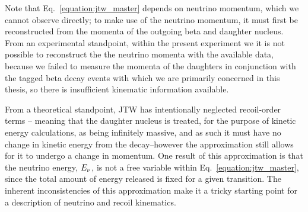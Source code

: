 



Note that Eq.~\ref{equation:jtw_master} depends on neutrino momentum, which we cannot observe directly;  to make use of the neutrino momentum, it must first be reconstructed from the momenta of the outgoing beta and daughter nucleus.
From an experimental standpoint, within the present experiment we it is not possible to reconstruct the the neutrino momenta with the available data, because we failed to measure the momenta of the daughters in conjunction with the tagged beta decay events with which we are primarily concerned in this thesis, so there is insufficient kinematic information available.   

From a theoretical standpoint, JTW has intentionally neglected recoil-order terms -- meaning that the daughter nucleus is treated, for the purpose of kinetic energy calculations, as being infinitely massive, and as such it must have no change in kinetic energy from the decay--however the approximation still allows for it to undergo a change in momentum.  One result of this approximation is that the neutrino energy, $E_{\nu}$, is not a free variable within Eq.~\ref{equation:jtw_master}, since the total amount of energy released is fixed for a given transition.  The inherent inconsistencies of this approximation make it a tricky starting point for a description of neutrino and recoil kinematics.


